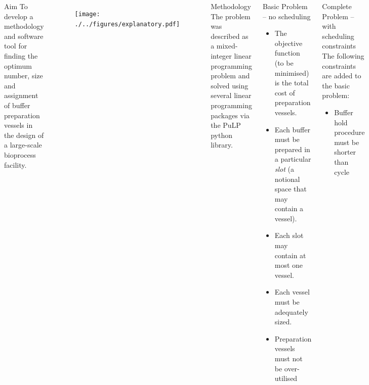 \documentclass[final]{beamer}
\begin{document}
\begin{frame}[t]
        \huge
        \begin{columns}[t]
                \begin{block}{\huge Aim}
                    To develop a methodology and software tool for finding the
                    optimum number, size and assignment of buffer preparation
                    vessels in the design of a large-scale bioprocess facility.
                \end{block}
                \begin{figure}
                    \texttt{[image: ./../figures/explanatory.pdf]}
                \end{figure}
                \begin{block}{\huge Methodology}
                    The problem was described as a mixed-integer linear
                    programming problem and solved using several linear
                    programming packages via the PuLP python library.
                 \end{block}
                \begin{block}{\huge Basic Problem -- no scheduling}
                    \begin{itemize}                 
                        \item The objective function (to be minimised) is the
                            total cost of preparation vessels.\\
                        \item Each buffer must be prepared in a particular 
                            \emph{slot} (a notional space that may contain a
                            vessel).
                        \item Each slot may contain at most one vessel.
                        \item Each vessel must be adequately sized.
                        \item{Preparation vessels must not be over-utilised}
                    \end{itemize}
                \end{block}
                \begin{block}{\huge Complete Problem -- with scheduling
                    constraints}
                    The following constraints are added to the basic problem:
                    \begin{itemize}                 
                        \item Buffer hold procedure must be shorter than cycle

\end{itemize}
\end{block}
\end{columns}
\end{frame}
\end{document}
